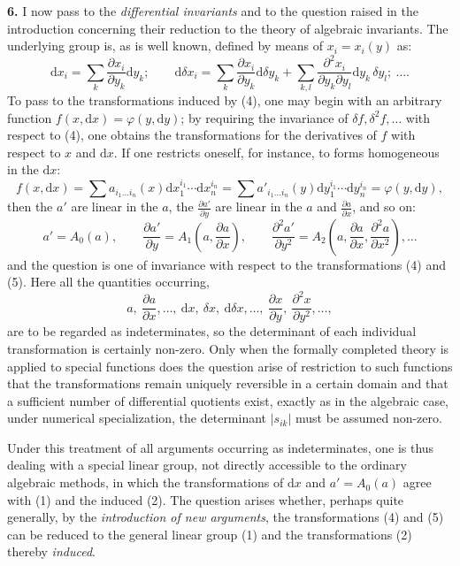 \documentclass[11pt]{article}
\providecommand{\dd}{\mathrm d}
\begin{document}
\textbf{6.} I now pass to the \emph{differential invariants} and to the question raised in the introduction concerning their reduction to the theory of algebraic invariants. The underlying group is, as is well known, defined by means of $x_i=x_i(y)$ as:
\[
\tag{4}
\dd x_i=\sum_k \frac{\partial x_i}{\partial y_k}\dd y_k;\qquad
\dd\delta x_i=\sum_k \frac{\partial x_i}{\partial y_k}\dd\delta y_k+
\sum_{k,l}\frac{\partial^2 x_i}{\partial y_k\partial y_l}\dd y_k\,\delta y_l;\ \ldots .
\]
To pass to the transformations induced by (4), one may begin with an arbitrary function $f(x,\dd x)=\varphi(y,\dd y)$; by requiring the invariance of $\delta f,\delta^2f,\ldots$ with respect to (4), one obtains the transformations for the derivatives of $f$ with respect to $x$ and $\dd x$. If one restricts oneself, for instance, to forms homogeneous in the $\dd x$:
\[
 f(x,\dd x)=\sum a_{i_1\ldots i_n}(x)\dd x_1^{i_1}\cdots\dd x_n^{i_n}
 =\sum a'_{i_1\ldots i_n}(y)\dd y_1^{i_1}\cdots\dd y_n^{i_n}
 =\varphi(y,\dd y),
\]
then the $a'$ are linear in the $a$, the $\frac{\partial a'}{\partial y}$ are linear in the $a$ and $\frac{\partial a}{\partial x}$, and so on:
\[
\tag{5}
a'=A_0(a),\qquad
\frac{\partial a'}{\partial y}=A_1\!\left(a,\frac{\partial a}{\partial x}\right),\qquad
\frac{\partial^2 a'}{\partial y^2}=A_2\!\left(a,\frac{\partial a}{\partial x},\frac{\partial^2 a}{\partial x^2}\right),\ldots
\]
and the question is one of invariance with respect to the transformations (4) and (5). Here all the quantities occurring,
\[
a,\ \frac{\partial a}{\partial x},\ldots,\ \dd x,\ \delta x,\ \dd\delta x,\ldots,\ 
\frac{\partial x}{\partial y},\ \frac{\partial^2 x}{\partial y^2},\ldots,
\]
are to be regarded as indeterminates, so the determinant of each individual transformation is certainly non-zero. Only when the formally completed theory is applied to special functions does the question arise of restriction to such functions that the transformations remain uniquely reversible in a certain domain and that a sufficient number of differential quotients exist, exactly as in the algebraic case, under numerical specialization, the determinant $|s_{ik}|$ must be assumed non-zero.

Under this treatment of all arguments occurring as indeterminates, one is thus dealing with a special linear group, not directly accessible to the ordinary algebraic methods, in which the transformations of $\dd x$ and $a'=A_0(a)$ agree with (1) and the induced (2). The question arises whether, perhaps quite generally, by the \emph{introduction of new arguments}, the transformations (4) and (5) can be reduced to the general linear group (1) and the transformations (2) thereby \emph{induced}.
\end{document}

